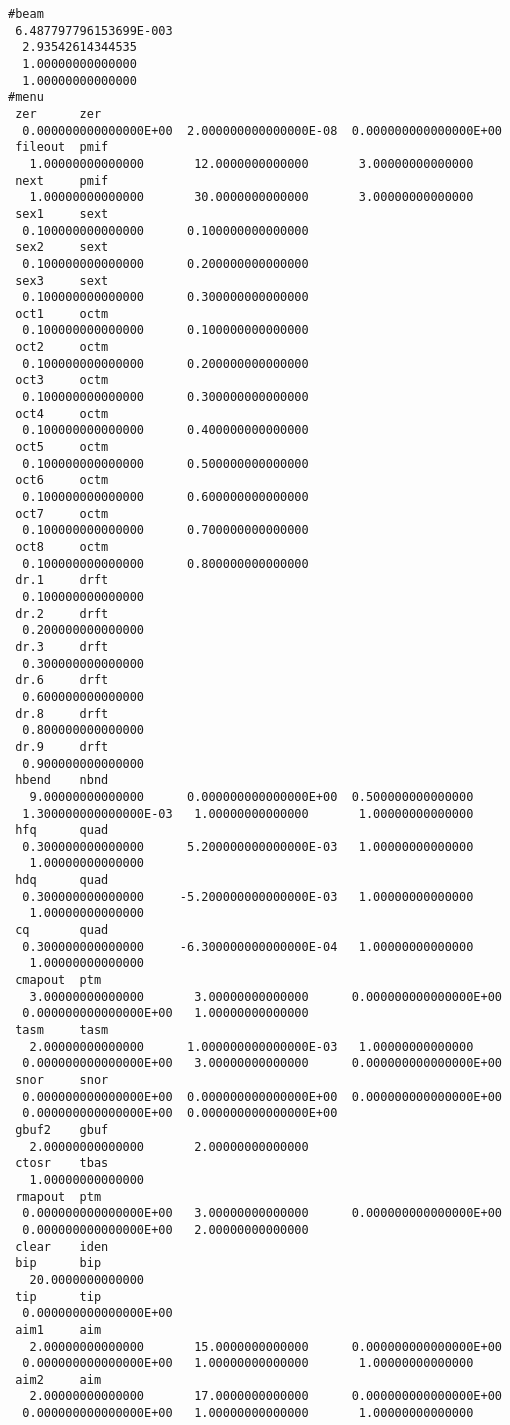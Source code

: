 \begin{footnotesize}
\begin{verbatim}
#beam
 6.487797796153699E-003
  2.93542614344535
  1.00000000000000
  1.00000000000000
#menu
 zer      zer
  0.000000000000000E+00  2.000000000000000E-08  0.000000000000000E+00
 fileout  pmif
   1.00000000000000       12.0000000000000       3.00000000000000
 next     pmif
   1.00000000000000       30.0000000000000       3.00000000000000
 sex1     sext
  0.100000000000000      0.100000000000000
 sex2     sext
  0.100000000000000      0.200000000000000
 sex3     sext
  0.100000000000000      0.300000000000000
 oct1     octm
  0.100000000000000      0.100000000000000
 oct2     octm
  0.100000000000000      0.200000000000000
 oct3     octm
  0.100000000000000      0.300000000000000
 oct4     octm
  0.100000000000000      0.400000000000000
 oct5     octm
  0.100000000000000      0.500000000000000
 oct6     octm
  0.100000000000000      0.600000000000000
 oct7     octm
  0.100000000000000      0.700000000000000
 oct8     octm
  0.100000000000000      0.800000000000000
 dr.1     drft
  0.100000000000000
 dr.2     drft
  0.200000000000000
 dr.3     drft
  0.300000000000000
 dr.6     drft
  0.600000000000000
 dr.8     drft
  0.800000000000000
 dr.9     drft
  0.900000000000000
 hbend    nbnd
   9.00000000000000      0.000000000000000E+00  0.500000000000000
  1.300000000000000E-03   1.00000000000000       1.00000000000000
 hfq      quad
  0.300000000000000      5.200000000000000E-03   1.00000000000000
   1.00000000000000
 hdq      quad
  0.300000000000000     -5.200000000000000E-03   1.00000000000000
   1.00000000000000
 cq       quad
  0.300000000000000     -6.300000000000000E-04   1.00000000000000
   1.00000000000000
 cmapout  ptm
   3.00000000000000       3.00000000000000      0.000000000000000E+00
  0.000000000000000E+00   1.00000000000000
 tasm     tasm
   2.00000000000000      1.000000000000000E-03   1.00000000000000
  0.000000000000000E+00   3.00000000000000      0.000000000000000E+00
 snor     snor
  0.000000000000000E+00  0.000000000000000E+00  0.000000000000000E+00
  0.000000000000000E+00  0.000000000000000E+00
 gbuf2    gbuf
   2.00000000000000       2.00000000000000
 ctosr    tbas
   1.00000000000000
 rmapout  ptm
  0.000000000000000E+00   3.00000000000000      0.000000000000000E+00
  0.000000000000000E+00   2.00000000000000
 clear    iden
 bip      bip
   20.0000000000000
 tip      tip
  0.000000000000000E+00
 aim1     aim
   2.00000000000000       15.0000000000000      0.000000000000000E+00
  0.000000000000000E+00   1.00000000000000       1.00000000000000
 aim2     aim
   2.00000000000000       17.0000000000000      0.000000000000000E+00
  0.000000000000000E+00   1.00000000000000       1.00000000000000

\end{verbatim}
\end{footnotesize}
